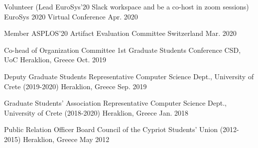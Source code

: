 

\begin{cvhonors}

  \cvhonor
    {Volunteer (Lead EuroSys'20 Slack workspace and be a co-host in
    zoom sessions)} %
    {EuroSys 2020} %
    {Virtual Conference} %
    {Apr. 2020} %


  \cvhonor
    {Member} %
    {ASPLOS'20 Artifact Evaluation Committee} %
    {Switzerland} %
    {Mar. 2020} %

  \cvhonor
    {Co-head of Organization Committee} %
    {1st Graduate Students Conference CSD, UoC} %
    {Heraklion, Greece} %
    {Oct. 2019} %

  \cvhonor
    {Deputy Graduate Students Representative} %
    {Computer Science Dept., University of Crete (2019-2020)} %
    {Heraklion, Greece} %
    {Sep. 2019} %

  \cvhonor
    {Graduate Students' Association Representative} %
    {Computer Science Dept., University of Crete (2018-2020)} %
    {Heraklion, Greece} %
    {Jan. 2018} %

  \cvhonor
    {Public Relation Officer} %
    {Board Council of the Cypriot Students' Union (2012-2015)} %
    {Heraklion, Greece} %
    {May 2012} %

\end{cvhonors}
